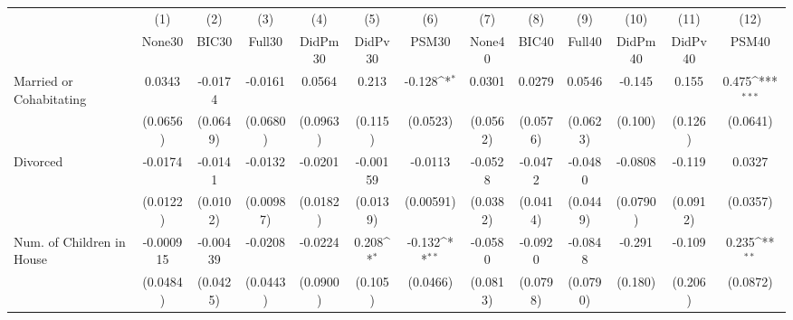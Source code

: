 {
\def\sym#1{\ifmmode^{#1}\else\(^{#1}\)\fi}
\begin{tabular}{l*{12}{c}}
\toprule
            &\multicolumn{1}{c}{(1)}&\multicolumn{1}{c}{(2)}&\multicolumn{1}{c}{(3)}&\multicolumn{1}{c}{(4)}&\multicolumn{1}{c}{(5)}&\multicolumn{1}{c}{(6)}&\multicolumn{1}{c}{(7)}&\multicolumn{1}{c}{(8)}&\multicolumn{1}{c}{(9)}&\multicolumn{1}{c}{(10)}&\multicolumn{1}{c}{(11)}&\multicolumn{1}{c}{(12)}\\
            &\multicolumn{1}{c}{None30}&\multicolumn{1}{c}{BIC30}&\multicolumn{1}{c}{Full30}&\multicolumn{1}{c}{DidPm30}&\multicolumn{1}{c}{DidPv30}&\multicolumn{1}{c}{PSM30}&\multicolumn{1}{c}{None40}&\multicolumn{1}{c}{BIC40}&\multicolumn{1}{c}{Full40}&\multicolumn{1}{c}{DidPm40}&\multicolumn{1}{c}{DidPv40}&\multicolumn{1}{c}{PSM40}\\
\midrule
Married or Cohabitating&      0.0343         &     -0.0174         &     -0.0161         &      0.0564         &       0.213         &      -0.128\sym{*}  &      0.0301         &      0.0279         &      0.0546         &      -0.145         &       0.155         &       0.475\sym{***}\\
            &    (0.0656)         &    (0.0649)         &    (0.0680)         &    (0.0963)         &     (0.115)         &    (0.0523)         &    (0.0562)         &    (0.0576)         &    (0.0623)         &     (0.100)         &     (0.126)         &    (0.0641)         \\
\addlinespace
Divorced    &     -0.0174         &     -0.0141         &     -0.0132         &     -0.0201         &    -0.00159         &     -0.0113         &     -0.0528         &     -0.0472         &     -0.0480         &     -0.0808         &      -0.119         &      0.0327         \\
            &    (0.0122)         &    (0.0102)         &   (0.00987)         &    (0.0182)         &    (0.0139)         &   (0.00591)         &    (0.0382)         &    (0.0414)         &    (0.0449)         &    (0.0790)         &    (0.0912)         &    (0.0357)         \\
\addlinespace
Num. of Children in House&   -0.000915         &    -0.00439         &     -0.0208         &     -0.0224         &       0.208\sym{*}  &      -0.132\sym{**} &     -0.0580         &     -0.0920         &     -0.0848         &      -0.291         &      -0.109         &       0.235\sym{**} \\
            &    (0.0484)         &    (0.0425)         &    (0.0443)         &    (0.0900)         &     (0.105)         &    (0.0466)         &    (0.0813)         &    (0.0798)         &    (0.0790)         &     (0.180)         &     (0.206)         &    (0.0872)         \\

\end{tabular}}
